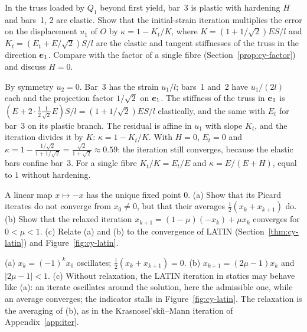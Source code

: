\label{exo:cy-q-factor}
%
In the truss loaded by $Q_1$ beyond first yield, bar~3 is plastic with
hardening $H$ and bars~1, 2 are elastic. Show that the initial-strain
iteration multiplies the error on the displacement $u_1$ of $O$ by
$\kappa=1-K_t/K$, where $K=(1+1/\sqrt2)ES/l$ and $K_t=(E_t+E/\sqrt2)S/l$ are
the elastic and tangent stiffnesses of the truss in the direction $\bm{e}_1$.
Compare with the factor of a single fibre (Section~\ref{prop:cy-factor}) and discuss $H=0$.
\begin{solution}
By symmetry $u_2=0$. Bar~3 has the strain $u_1/l$; bars~1 and~2 have
$u_1/(2l)$ each and the projection factor $1/\sqrt2$ on $\bm{e}_1$. The
stiffness of the truss in $\bm{e}_1$ is $(E+2\cdot\tfrac12\tfrac{1}{\sqrt2}E)S/l
=(1+1/\sqrt2)ES/l$ elastically, and the same with $E_t$ for bar~3 on its plastic
branch. The residual is affine in $u_1$ with slope $K_t$, and the iteration
divides it by $K$: $\kappa=1-K_t/K$. With $H=0$, $E_t=0$ and
$\kappa=1-\frac{1/\sqrt2}{1+1/\sqrt2}=\frac{\sqrt2}{1+\sqrt2}\approx0.59$: the
iteration still converges, because the elastic bars confine bar~3. For a
single fibre $K_t/K=E_t/E$ and $\kappa=E/(E+H)$, equal to $1$ without
hardening.
\end{solution}

\label{exo:cy-q-relax}
%
A linear map $x\mapsto -x$ has the unique fixed point $0$. (a) Show that its
Picard iterates do not converge from $x_0\ne0$, but that their averages
$\tfrac12(x_k+x_{k+1})$ do. (b) Show that the relaxed iteration
$x_{k+1}=(1-\mu)(-x_k)+\mu x_k$ converges for $0<\mu<1$. (c) Relate (a) and (b)
to the convergence of LATIN (Section~\ref{thm:cy-latin}) and Figure~\ref{fig:cy-latin}.
\begin{solution}
(a) $x_k=(-1)^kx_0$ oscillates; $\tfrac12(x_k+x_{k+1})=0$. (b)
$x_{k+1}=(2\mu-1)x_k$ and $|2\mu-1|<1$. (c) Without relaxation, the LATIN
iteration in statics may behave like (a): an iterate oscillates around the
solution, here the admissible one, while an average converges; the
indicator stalls in Figure~\ref{fig:cy-latin}. The relaxation is the
averaging of (b), as in the Krasnosel'ski\u{\i}--Mann iteration of
Appendix~\ref{app:iter}.
\end{solution}

